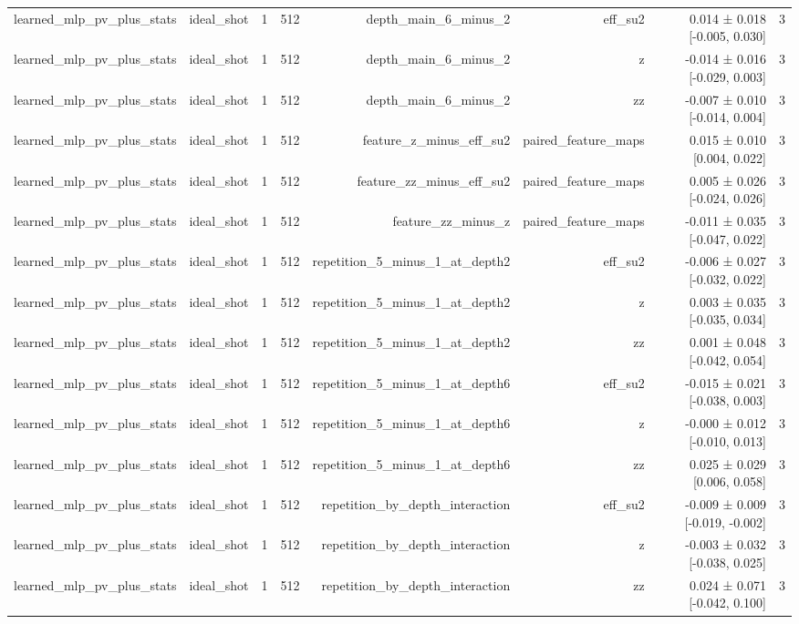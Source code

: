 \begin{table}
\begin{tabular}{lrrrrrrr}
learned\_mlp\_pv\_plus\_stats & ideal\_shot & 1 & 512 & depth\_main\_6\_minus\_2 & eff\_su2 & 0.014 ± 0.018 [-0.005, 0.030] & 3 \\
learned\_mlp\_pv\_plus\_stats & ideal\_shot & 1 & 512 & depth\_main\_6\_minus\_2 & z & -0.014 ± 0.016 [-0.029, 0.003] & 3 \\
learned\_mlp\_pv\_plus\_stats & ideal\_shot & 1 & 512 & depth\_main\_6\_minus\_2 & zz & -0.007 ± 0.010 [-0.014, 0.004] & 3 \\
learned\_mlp\_pv\_plus\_stats & ideal\_shot & 1 & 512 & feature\_z\_minus\_eff\_su2 & paired\_feature\_maps & 0.015 ± 0.010 [0.004, 0.022] & 3 \\
learned\_mlp\_pv\_plus\_stats & ideal\_shot & 1 & 512 & feature\_zz\_minus\_eff\_su2 & paired\_feature\_maps & 0.005 ± 0.026 [-0.024, 0.026] & 3 \\
learned\_mlp\_pv\_plus\_stats & ideal\_shot & 1 & 512 & feature\_zz\_minus\_z & paired\_feature\_maps & -0.011 ± 0.035 [-0.047, 0.022] & 3 \\
learned\_mlp\_pv\_plus\_stats & ideal\_shot & 1 & 512 & repetition\_5\_minus\_1\_at\_depth2 & eff\_su2 & -0.006 ± 0.027 [-0.032, 0.022] & 3 \\
learned\_mlp\_pv\_plus\_stats & ideal\_shot & 1 & 512 & repetition\_5\_minus\_1\_at\_depth2 & z & 0.003 ± 0.035 [-0.035, 0.034] & 3 \\
learned\_mlp\_pv\_plus\_stats & ideal\_shot & 1 & 512 & repetition\_5\_minus\_1\_at\_depth2 & zz & 0.001 ± 0.048 [-0.042, 0.054] & 3 \\
learned\_mlp\_pv\_plus\_stats & ideal\_shot & 1 & 512 & repetition\_5\_minus\_1\_at\_depth6 & eff\_su2 & -0.015 ± 0.021 [-0.038, 0.003] & 3 \\
learned\_mlp\_pv\_plus\_stats & ideal\_shot & 1 & 512 & repetition\_5\_minus\_1\_at\_depth6 & z & -0.000 ± 0.012 [-0.010, 0.013] & 3 \\
learned\_mlp\_pv\_plus\_stats & ideal\_shot & 1 & 512 & repetition\_5\_minus\_1\_at\_depth6 & zz & 0.025 ± 0.029 [0.006, 0.058] & 3 \\
learned\_mlp\_pv\_plus\_stats & ideal\_shot & 1 & 512 & repetition\_by\_depth\_interaction & eff\_su2 & -0.009 ± 0.009 [-0.019, -0.002] & 3 \\
learned\_mlp\_pv\_plus\_stats & ideal\_shot & 1 & 512 & repetition\_by\_depth\_interaction & z & -0.003 ± 0.032 [-0.038, 0.025] & 3 \\
learned\_mlp\_pv\_plus\_stats & ideal\_shot & 1 & 512 & repetition\_by\_depth\_interaction & zz & 0.024 ± 0.071 [-0.042, 0.100] & 3 \\

\end{tabular}
\end{table}

